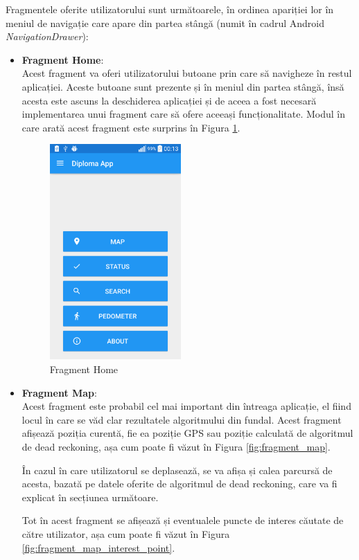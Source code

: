 \documentclass[12pt, a4paper, oneside]{article}
\begin{document}
Fragmentele oferite utilizatorului sunt următoarele, în ordinea apariției lor în meniul de navigație care apare din partea stângă (numit în cadrul Android \textit{NavigationDrawer}):

\begin{itemize}  
\item \textbf{Fragment Home}:\\
Acest fragment va oferi utilizatorului butoane prin care să navigheze în restul aplicației. Aceste butoane sunt prezente și în meniul din partea stângă, însă acesta este ascuns la deschiderea aplicației și de aceea a fost necesară implementarea unui fragment care să ofere aceeași funcționalitate. Modul în care arată acest fragment este surprins în Figura \ref{fig:fragment_home}.

\begin{figure}[h]
\centering
\includegraphics[width=5cm]{figures/fragment_home.png}
\caption{Fragment Home}
\label{fig:fragment_home}
\end{figure}


\item \textbf{Fragment Map}:\\
Acest fragment este probabil cel mai important din întreaga aplicație, el fiind locul în care se văd clar rezultatele algoritmului din fundal. Acest fragment afișează poziția curentă, fie ea poziție GPS sau poziție calculată de algoritmul de dead reckoning, așa cum poate fi văzut în Figura \ref{fig:fragment_map}.

În cazul în care utilizatorul se deplasează, se va afișa și calea parcursă de acesta, bazată pe datele oferite de algoritmul de dead reckoning, care va fi explicat în secțiunea următoare.

Tot în acest fragment se afișează și eventualele puncte de interes căutate de către utilizator, așa cum poate fi văzut în Figura \ref{fig:fragment_map_interest_point}.


\end{itemize}
\end{document}

